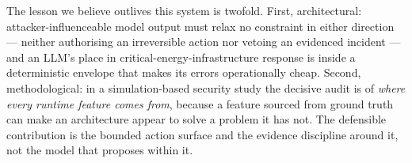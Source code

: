 The lesson we believe outlives this system is twofold. First,
architectural: attacker-influenceable model output must relax no
constraint in either direction --- neither authorising an irreversible
action nor vetoing an evidenced incident --- and an LLM's place in
critical-energy-infrastructure response is inside a deterministic
envelope that makes its errors operationally cheap. Second,
methodological: in a simulation-based security study the decisive audit
is of \emph{where every runtime feature comes from}, because a feature
sourced from ground truth can make an architecture appear to solve a
problem it has not. The defensible contribution is the bounded action
surface and the evidence discipline around it, not the model that
proposes within it.
